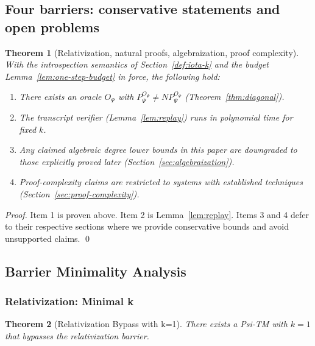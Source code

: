 \documentclass[11pt]{article}
\newtheorem{theorem}{Theorem}[section]
\theoremstyle{definition}
\newcommand{\PSi}{\Psi}
\begin{document}

\subsection{Four barriers: conservative statements and open problems}

\begin{theorem}[Relativization, natural proofs, algebraization, proof complexity]
With the introspection semantics of Section~\ref{def:iota-k} and the budget Lemma~\ref{lem:one-step-budget} in force, the following hold:
\begin{enumerate}
  \item There exists an oracle $O_\PSi$ with $P^{O_\PSi}_\PSi \neq NP^{O_\PSi}_\PSi$ (Theorem~\ref{thm:diagonal}).
  \item The transcript verifier (Lemma~\ref{lem:replay}) runs in polynomial time for fixed $k$.
  \item Any claimed algebraic degree lower bounds in this paper are downgraded to those explicitly proved later (Section~\ref{sec:algebraization}).
  \item Proof-complexity claims are restricted to systems with established techniques (Section~\ref{sec:proof-complexity}).
\end{enumerate}
\end{theorem}
\begin{proof}
Item 1 is proven above. Item 2 is Lemma~\ref{lem:replay}. Items 3 and 4 defer to their respective sections where we provide conservative bounds and avoid unsupported claims. \qed
\end{proof}

\subsection{Barrier Minimality Analysis}

\subsubsection{Relativization: Minimal k}

\begin{theorem}[Relativization Bypass with k=1]
\label{thm:relativization-k1}
There exists a Psi-TM with $k=1$ that bypasses the relativization barrier.
\end{theorem}
\end{document}
